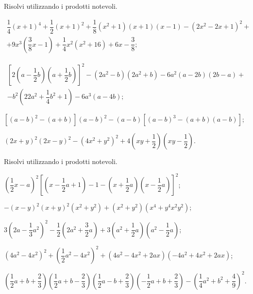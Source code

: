 \begin{esercizio}[\Ast]
 \label{ese:12.44}
Risolvi utilizzando i prodotti notevoli.
 \begin{enumeratea}
 \item
 \begin{multline*}
 \dfrac{1}{4}(x+1)^{4}+\dfrac{1}{2}(x+1)^{2}+\dfrac{1}{8}\left(x^{2}+1\right)(x+1)(x-1)-\left(2x^{2}-2x+1\right)^{2}+\\
 +9x^{3}\left(\dfrac{3}{8}x-1\right)+\dfrac{1}{4}x^{2}\left(x^{2}+16\right)+6x-\dfrac{3}{8};
 \end{multline*}
 \item
 \begin{multline*}
 \left[2\left(a-\dfrac{1}{2}b\right)\left(a+\dfrac{1}{2}b\right)\right]^{2}-\left(2a^{2}-b\right)\left(2a^{2}+b\right)-6a^{2}(a-2b)(2b-a)+\\
 -b^{2}\left(22a^{2}+\dfrac{1}{4}b^{2}+1\right)-6a^{3}(a-4b);
 \end{multline*}
 \item $\left[(a-b)^{2}-(a+b)\right](a-b)^{2}-(a-b)\left[(a-b)^{3}-(a+b)(a-b)\right]$;
 \item $(2x+y)^{2}(2x-y)^{2}-\left(4x^{2}+y^{2}\right)^{2}+4\left(xy+\dfrac{1}{2}\right)\left(xy-\dfrac{1}{2}\right)$.
 \end{enumeratea}
\end{esercizio}

\begin{esercizio}[\Ast]
 \label{ese:12.45}
Risolvi utilizzando i prodotti notevoli.
 \begin{enumeratea}
 \item $\left(\dfrac{1}{2}x-a\right)^{2}\left[\left(x-\dfrac{1}{2}a+1\right)-1-\left(x+\dfrac{1}{2}a\right)\left(x-\dfrac{1}{2}a\right)\right]^{2}$;
 \item $-(x-y)^2(x+y)^2\left(x^{2}+y^{2}\right)+\left(x^{2}+y^{2}\right)\left(x^{4}+y^{4}x^{2}y^{2}\right)$;
 \item $3\left(2a-\dfrac{1}{3}a^{2}\right)^{2}-\dfrac{1}{2}\left(2a^{2}+\dfrac{3}{2}a\right)+3\left(a^{2}+\dfrac{1}{2}a\right)\left(a^{2}-\dfrac{1}{2}a\right)$;
 \item $\left(4a^{2}-4x^{2}\right)^{2}+\left(\dfrac{1}{2}a^{2}-4x^{2}\right)^{2}+\left(4a^{2}-4x^{2}+2ax\right)\left(-4a^{2}+4x^{2}+2ax\right)$;
 \item $\left(\dfrac{1}{2}a+b+\dfrac{2}{3}\right)\left(\dfrac{1}{2}a+b-\dfrac{2}{3}\right)\left(\dfrac{1}{2}a-b+\dfrac{2}{3}\right)\left(-\dfrac{1}{2}a+b+\dfrac{2}{3}\right)-\left(\dfrac{1}{4}a^{2}+b^{2}+\dfrac{4}{9}\right)^{2}$.
 \end{enumeratea}
\end{esercizio}

